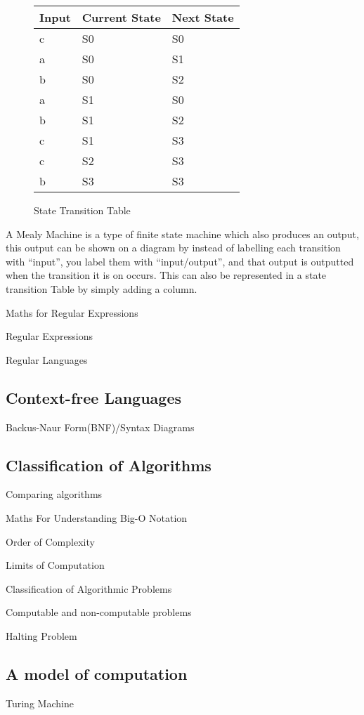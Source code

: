   \begin{figure}[H]
    \centering
    \begin{tabular}{| C{4cm} | C{4cm} | C{4cm} |}
      \hline
      Input & Current State & Next State \\
      \hline
      c & S0 & S0 \\
      a & S0 & S1 \\
      b & S0 & S2 \\
      a & S1 & S0 \\
      b & S1 & S2 \\
      c & S1 & S3 \\
      c & S2 & S3 \\
      b & S3 & S3 \\
      \hline
    \end{tabular}
    \caption*{State Transition Table}
  \end{figure}
  A Mealy Machine is a type of finite state machine which also produces an output, this output can be shown on a diagram by instead of labelling each transition with ``input'', you label them with ``input/output'', and that output is outputted when the transition it is on occurs. This can also be represented in a state transition Table by simply adding a column.
  
  \noindent
  Maths for Regular Expressions
  
  \noindent
  Regular Expressions
  
  \noindent
  Regular Languages
  
\subsection{Context-free Languages}
  
  \noindent
  Backus-Naur Form(BNF)/Syntax Diagrams
  
\subsection{Classification of Algorithms}
  
  \noindent
  Comparing algorithms
  
  \noindent
  Maths For Understanding Big-O Notation
  
  \noindent
  Order of Complexity
  
  \noindent
  Limits of Computation
  
  \noindent
  Classification of Algorithmic Problems
  
  \noindent
  Computable and non-computable problems
  
  \noindent
  Halting Problem

\subsection{A model of computation}
  \noindent
  Turing Machine